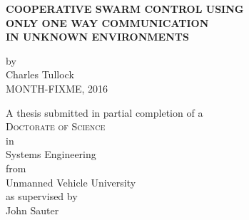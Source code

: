 \begin{titlepage}
	\begin{center}

		\vspace*{1cm}
		 
		\large{ \textbf{ \uppercase{Cooperative swarm control using\\only one way communication\\in unknown environments}}}
		
		\vspace{1.5cm}
		
		by\\
		Charles Tullock\\
		MONTH-FIXME, 2016
		
		\vspace{3cm}
		
		A thesis submitted in partial completion of a\\
		\large{\textsc{Doctorate of Science}}\\ 
		in\\
		\large{Systems Engineering}\\
		from\\
		\large{Unmanned Vehicle University}\\
		as supervised by\\
		\large{John Sauter}
		\vfill

	\end{center}
\thispagestyle{empty}
\end{titlepage}

